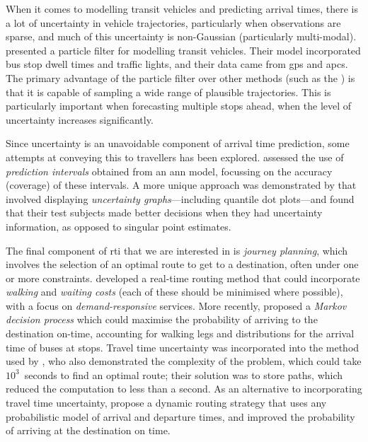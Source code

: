 When it comes to modelling transit vehicles and predicting arrival times, there is a lot of uncertainty in vehicle trajectories, particularly when observations are sparse, and much of this uncertainty is non-Gaussian (particularly multi-modal).  presented a particle filter for modelling transit vehicles. Their model incorporated bus stop dwell times and traffic lights, and their data came from \gls{gps} and \glspl{apc}. The primary advantage of the particle filter over other methods (such as the \kf{}) is that it is capable of sampling a wide range of plausible trajectories. This is particularly important when forecasting multiple stops ahead, when the level of uncertainty increases significantly.


Since uncertainty is an unavoidable component of arrival time prediction, some attempts at conveying this to travellers has been explored.  assessed the use of \emph{prediction intervals} obtained from an \gls{ann} model, focussing on the accuracy (coverage) of these intervals. A more unique approach was demonstrated by \citet{Fernandes_2018} that involved displaying \emph{uncertainty graphs}---including quantile dot plots---and found that their test subjects made better decisions when they had uncertainty information, as opposed to singular point estimates.


The final component of \gls{rti} that we are interested in is \emph{journey planning}, which involves the selection of an optimal route to get to a destination, often under one or more constraints.  developed a real-time routing method that could incorporate \emph{walking} and \emph{waiting costs} (each of these should be minimised where possible), with a focus on \emph{demand-responsive} services. More recently, \citet{Hame_2013a,Hame_2013b} proposed a \emph{Markov decision process} which could maximise the probability of arriving to the destination on-time, accounting for walking legs and distributions for the arrival time of buses at stops. Travel time uncertainty was incorporated into the method used by \citet{Zheng_2016}, who also demonstrated the complexity of the problem, which could take $10^3$~seconds to find an optimal route; their solution was to store paths, which reduced the computation to less than a second. As an alternative to incorporating travel time uncertainty, \citet{Berczi_2017} propose a dynamic routing strategy that uses any probabilistic model of arrival and departure times, and improved the probability of arriving at the destination on time.



